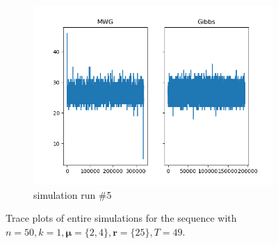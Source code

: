 \begin{figure}[H]
\begin{subfigure}{.3\textwidth}
    	\includegraphics[width=\linewidth]{../../plots/Trace_M2_N50_NMCMC1_seed4_diffind2.png}
    	\caption{simulation run \#5}
	\end{subfigure}
	\caption{Trace plots of entire simulations for the sequence with $n=50, k=1, \bm{\mu} = \{2,4\}, \bm{r} = \{25\}, T=49$.}
\end{figure}

